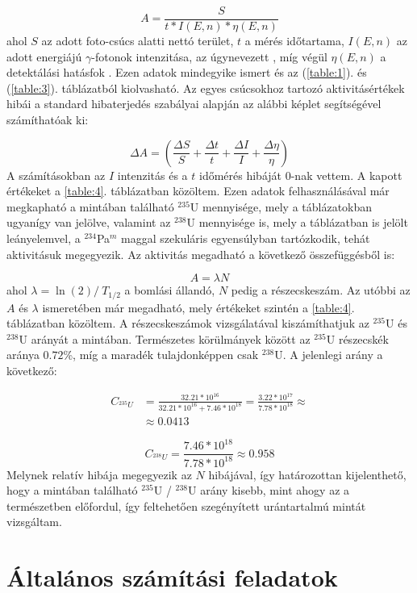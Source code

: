\begin{multicols}{2}
\begin{equation}
A
=
\frac{S}{t * I \left( E, n \right) * \eta \left( E, n \right)}
\end{equation}
ahol $S$ az adott foto-csúcs alatti nettó terület, $t$ a mérés időtartama, $I \left( E, n \right)$ az adott energiájú $\gamma$-fotonok intenzitása, az úgynevezett , míg végül $\eta \left( E, n \right)$ a detektálási hatásfok \citep{gamma_ray_spec}. \newline
Ezen adatok mindegyike ismert és az (\ref{table:1}). és (\ref{table:3}). táblázatból kiolvasható. Az egyes csúcsokhoz tartozó aktivitásértékek hibái a standard hibaterjedés szabályai alapján az alábbi képlet segítségével számíthatóak ki:

\begin{equation}
\Delta A
=
\left(
\frac{\Delta S}{S} + \frac{\Delta t}{t} + \frac{\Delta I}{I} + \frac{\Delta \eta}{\eta}
\right)
\end{equation}
A számításokban az $I$ intenzitás és a $t$ időmérés hibáját $0$-nak vettem. A kapott értékeket a \ref{table:4}. táblázatban közöltem. Ezen adatok felhasználásával már megkapható a mintában található $^{235}$U mennyisége, mely a táblázatokban ugyanígy van jelölve, valamint az $^{238}$U mennyisége is, mely a táblázatban is jelölt leányelemvel, a $^{234}$Pa$^{m}$ maggal szekuláris egyensúlyban tartózkodik, tehát aktivitásuk megegyezik. Az aktivitás megadható a következő összefüggésből is:

\begin{equation}
A = \lambda N
\end{equation}
ahol $\lambda = \ln \left( 2 \right) /\ T_{1/2}$ a bomlási állandó, $N$ pedig a részecskeszám. Az utóbbi az $A$ és $\lambda$ ismeretében már megadható, mely értékeket szintén a \ref{table:4}. táblázatban közöltem. A részecskeszámok vizsgálatával kiszámíthatjuk az $^{235}$U és $^{238}$U arányát a mintában. Természetes körülmányek között az $^{235}$U részecskék aránya $0.72$\%, míg a maradék tulajdonképpen csak $^{238}$U. A jelenlegi arány a következő:

\begin{align}
C_{^{235}U}
&=
\frac{32.21 * 10^{16}}{32.21 * 10^{16} + 7.46 * 10^{18}}
=
\frac{3.22 * 10^{17}}{7.78 * 10^{18}}
\approx \nonumber \\
&\approx
0.0413
\end{align}

\begin{equation}
C_{^{238}U}
=
\frac{7.46 * 10^{18}}{7.78 * 10^{18}}
\approx
0.958
\end{equation}
Melynek relatív hibája megegyezik az $N$ hibájával, így határozottan kijelenthető, hogy a mintában található $^{235}$U / $^{238}$U arány kisebb, mint ahogy az a természetben előfordul, így feltehetően szegényített urántartalmú mintát vizsgáltam.

\section{Általános számítási feladatok}


\end{multicols}